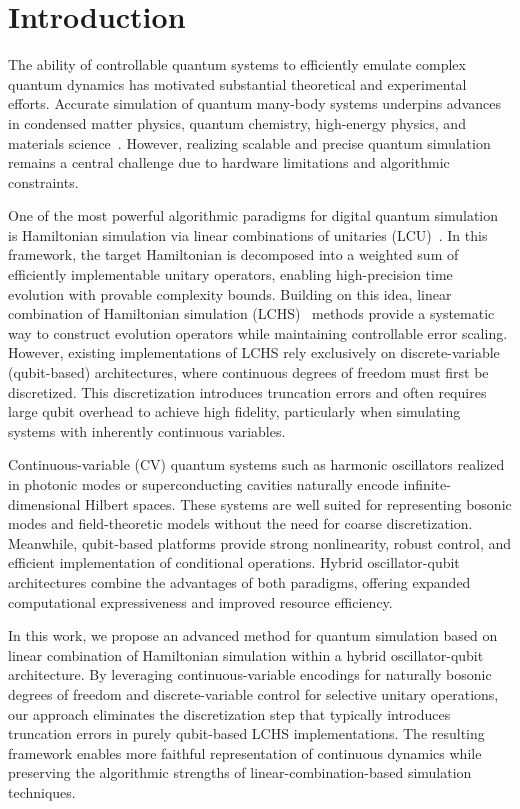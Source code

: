 \documentclass{article}
\begin{document}
\section{Introduction}

The ability of controllable quantum systems to efficiently emulate complex quantum dynamics has motivated substantial theoretical and experimental efforts. Accurate simulation of quantum many-body systems underpins advances in condensed matter physics, quantum chemistry, high-energy physics, and materials science~\cite{Clinton_2024}. However, realizing scalable and precise quantum simulation remains a central challenge due to hardware limitations and algorithmic constraints.

One of the most powerful algorithmic paradigms for digital quantum simulation is Hamiltonian simulation via linear combinations of unitaries (LCU)~\cite{wiebelcu}. In this framework, the target Hamiltonian is decomposed into a weighted sum of efficiently implementable unitary operators, enabling high-precision time evolution with provable complexity bounds. Building on this idea, linear combination of Hamiltonian simulation (LCHS)~\cite{LCHS1,LCHS2} methods provide a systematic way to construct evolution operators while maintaining controllable error scaling. However, existing implementations of LCHS rely exclusively on discrete-variable (qubit-based) architectures, where continuous degrees of freedom must first be discretized. This discretization introduces truncation errors and often requires large qubit overhead to achieve high fidelity, particularly when simulating systems with inherently continuous variables.

Continuous-variable (CV) quantum systems such as harmonic oscillators realized in photonic modes or superconducting cavities naturally encode infinite-dimensional Hilbert spaces. These systems are well suited for representing bosonic modes and field-theoretic models without the need for coarse discretization. Meanwhile, qubit-based platforms provide strong nonlinearity, robust control, and efficient implementation of conditional operations. Hybrid oscillator-qubit architectures combine the advantages of both paradigms, offering expanded computational expressiveness and improved resource efficiency.

In this work, we propose an advanced method for quantum simulation based on linear combination of Hamiltonian simulation within a hybrid oscillator-qubit architecture. By leveraging continuous-variable encodings for naturally bosonic degrees of freedom and discrete-variable control for selective unitary operations, our approach eliminates the discretization step that typically introduces truncation errors in purely qubit-based LCHS implementations. The resulting framework enables more faithful representation of continuous dynamics while preserving the algorithmic strengths of linear-combination-based simulation techniques.
\end{document}
